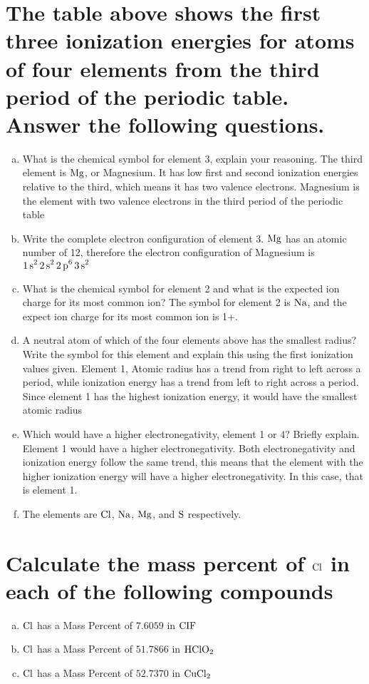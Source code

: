 \documentclass[11pt]{article}
\begin{document}
\section{The table above shows the first three ionization energies for atoms of four elements from the third period of the periodic table. Answer the following questions.}
\label{sec:orge3097f2}
\begin{enumerate}[(a)]
\item What is the chemical symbol for element 3, explain your reasoning.
The third element is \(\ce{Mg}\), or Magnesium. It has low first and second ionization energies relative to the third, which means it has two valence electrons. Magnesium is the element with two valence electrons in the third period of the periodic table

\item Write the complete electron configuration of element 3.
\(\ce{Mg}\) has an atomic number of 12, therefore the electron configuration of Magnesium is \(\ce{1s^2 2s^2 2p^6 3s^2}\)

\item What is the chemical symbol for element 2 and what is the expected ion charge for its most common ion?
The symbol for element 2 is \(\ce{Na}\), and the expect ion charge for its most common ion is 1+.

\item A neutral atom of which of the four elements above has the smallest radius? Write the symbol for this element and explain this using the first ionization values given.
Element 1, Atomic radius has a trend from right to left across a period, while ionization energy has a trend from left to right across a period. Since element 1 has the highest ionization energy, it would have the smallest atomic radius

\item Which would have a higher electronegativity, element 1 or 4? Briefly explain.
Element 1 would have a higher electronegativity. Both electronegativity and ionization energy follow the same trend, this means that the element with the higher ionization energy will have a higher electronegativity. In this case, that is element 1.

\item The elements are \(\ce{Cl}\), \(\ce{Na}\), \(\ce{Mg}\), and \(\ce{S}\) respectively.
\end{enumerate}

\section{Calculate the mass percent of \(\ce{Cl}\) in each of the following compounds}
\label{sec:orga54203e}
\begin{enumerate}[(a)]
\item \(\ce{Cl}\)  has a Mass Percent of \(7.6059\) in \(\ce{CIF}\)
\item \(\ce{Cl}\)  has a Mass Percent of \(51.7866\) in \(\ce{HClO2}\)
\item \(\ce{Cl}\)  has a Mass Percent of \(52.7370\) in \(\ce{CuCl2}\)
\end{enumerate}
\end{document}
